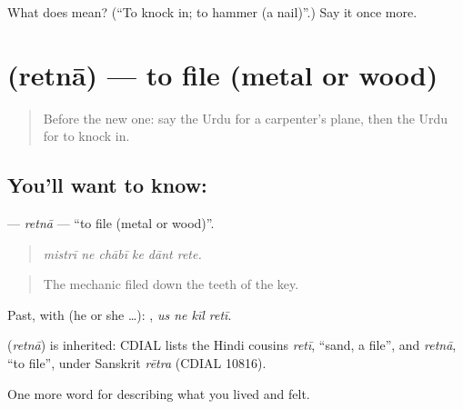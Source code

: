 \begin{tcolorbox}[breakable,colback=teal!4,colframe=teal!35!black,title={Before you move on}]
What does  mean? (\textquotedblleft{}To knock in; to hammer (a nail)\textquotedblright{}.) Say it once more.
\end{tcolorbox}
\section[\texorpdfstring{\ur{ریتنا} (retnā)}{ریتنا (retnā)}]{ (retnā) — to file (metal or wood)}

\label{lesson:UR-C497-retna}



\begin{quote}
Before the new one: say the Urdu for a carpenter's plane, then the Urdu for to knock in.
\end{quote}

\subsection*{You'll want to know: }
\textbf{} — \emph{retnā} — \textquotedblleft{}to file (metal or wood)\textquotedblright{}.

\begin{quote}
     
\end{quote}

\begin{quote}
\emph{mistrī ne chābī ke dānt rete.}
\end{quote}

\begin{quote}
The mechanic filed down the teeth of the key.
\end{quote}

Past, with  (he or she …):    , \emph{us ne kīl retī}.

\begin{cousinweb}
\textbf{} (\emph{retnā}) is inherited: CDIAL lists the Hindi cousins \emph{retī}, \textquotedblleft{}sand, a file\textquotedblright{}, and \emph{retnā}, \textquotedblleft{}to file\textquotedblright{}, under Sanskrit \emph{rētra} (CDIAL 10816).
\end{cousinweb}

\begin{grammarlens}[title={What you've built}]
One more word for describing what you lived and felt.
\end{grammarlens}

